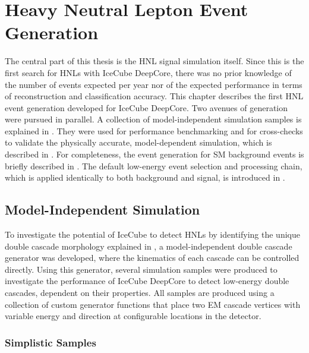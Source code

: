 \setchapterpreamble[u]{\margintoc}

\chapter{Heavy Neutral Lepton Event Generation}

The central part of this thesis is the HNL signal simulation itself. Since this is the first search for HNLs with IceCube DeepCore, there was no prior knowledge of the number of events expected per year nor of the expected performance in terms of reconstruction and classification accuracy. This chapter describes the first HNL event generation developed for IceCube DeepCore. Two avenues of generation were pursued in parallel. A collection of model-independent simulation samples is explained in . They were used for performance benchmarking and for cross-checks to validate the physically accurate, model-dependent simulation, which is described in . For completeness, the event generation for SM background events is briefly described in . The default low-energy event selection and processing chain, which is applied identically to both background and signal, is introduced in .



\section{Model-Independent Simulation} 

To investigate the potential of IceCube to detect HNLs by identifying the unique double cascade morphology explained in , a model-independent double cascade generator was developed, where the kinematics of each cascade can be controlled directly. Using this generator, several simulation samples were produced to investigate the performance of IceCube DeepCore to detect low-energy double cascades, dependent on their properties. All samples are produced using a collection of custom generator functions \cite{cascade_generator_functions} that place two EM cascade vertices with variable energy and direction at configurable locations in the detector.


\subsection{Simplistic Samples} 

